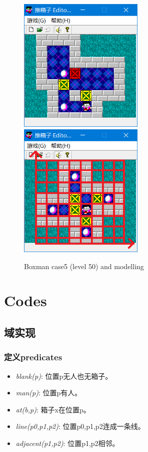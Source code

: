 \documentclass[a4paper, 11pt]{article}
\begin{document}
\begin{figure}[H]
  \centering
  \includegraphics[width=6cm]{Pic/case5}
  \qquad
  \includegraphics[width=6cm]{Pic/model}
  \caption{Boxman case5 (level 50) and modelling}
\end{figure}


\section{Codes}
\subsection{域实现}
\subsubsection{定义predicates}
\begin{itemize}
\item\textit{blank(p)}: 位置p无人也无箱子。
\item\textit{man(p)}: 位置p有人。
\item\textit{at(b,p)}: 箱子x在位置p。
\item\textit{line(p0,p1,p2)}: 位置p0,p1,p2连成一条线。
\item\textit{adjacent(p1,p2)}: 位置p1,p2相邻。
\end{itemize}
\end{document}
